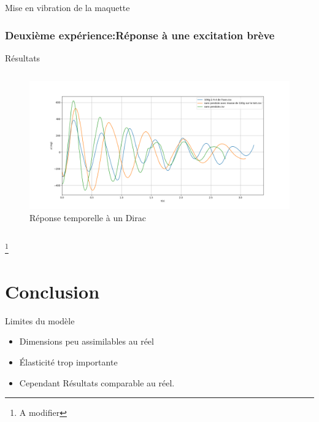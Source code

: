 \documentclass{beamer}
\begin{document}
	
	
	
	\begin{frame}{Mise en vibration de la maquette}
		\frametitle{Deuxième expérience:Réponse à une excitation brève}
		\centering Résultats
		\vspace{12pt}
		\begin{columns}[onlytextwidth]
			\begin{column}{1\textwidth}
				\centering
				\begin{figure}
					\includegraphics[width=1\textwidth]{Image/Dirac.png}
					\caption{Réponse temporelle à un Dirac}
				\end{figure}
				
			\end{column}
		\end{columns}
		\footnote{A modifier}
	\end{frame}
	
	
	
	
	

	
	
			
	
	\section{Conclusion}
	
	\begin{frame}{Limites du modèle}
		\begin{itemize}
			\item Dimensions peu assimilables au réel
			\item Élasticité trop importante 
			\item Cependant Résultats comparable au réel.
		\end{itemize}	
		\vspace{12pt}
		
	\end{frame}
	
\end{document}
